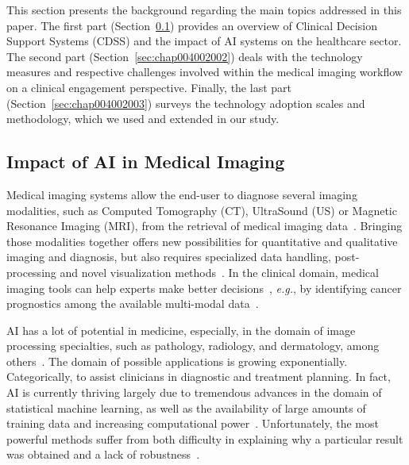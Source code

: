 This section presents the background regarding the main topics addressed in this paper.
The first part (Section~\ref{sec:chap004002001}) provides an overview of Clinical Decision Support Systems (CDSS) and the impact of AI systems on the healthcare sector.
The second part (Section~\ref{sec:chap004002002}) deals with the technology measures and respective challenges involved within the medical imaging workflow on a clinical engagement perspective.
Finally, the last part (Section~\ref{sec:chap004002003}) surveys the technology adoption scales and methodology, which we used and extended in our study.

\subsection{Impact of AI in Medical Imaging}
\label{sec:chap004002001}

Medical imaging systems allow the end-user to diagnose several imaging modalities, such as Computed Tomography (CT), UltraSound (US) or Magnetic Resonance Imaging (MRI), from the retrieval of medical imaging data~\cite{WO2022071818A1, faraji2019radiologic, seifabadi2019correlation}.
Bringing those modalities together offers new possibilities for quantitative and qualitative imaging and diagnosis, but also requires specialized data handling, post-processing and novel visualization methods~\cite{Igarashi:2016:IVS:2984511.2984537, Ocegueda-Hernandez:2016:CMN:2876456.2879485, Sousa:2017:VVR:3025453.3025566}.
In the clinical domain, medical imaging tools can help experts make better decisions~\cite{Lopes:2017:UHC:3143820.3144118}, {\it e.g.}, by identifying cancer prognostics among the available multi-modal data~\cite{calisto2017mimbcdui, lopes2018interaction}.

AI has a lot of potential in medicine, especially, in the domain of image processing specialties, such as pathology, radiology, and dermatology, among others~\cite{EVANS2022281, MULLER202267}.
The domain of possible applications is growing exponentially.
Categorically, to assist clinicians in diagnostic and treatment planning.
In fact, AI is currently thriving largely due to tremendous advances in the domain of statistical machine learning, as well as the availability of large amounts of training data and increasing computational power~\cite{10.1145/3399715.3399744}.
Unfortunately, the most powerful methods suffer from both difficulty in explaining why a particular result was obtained and a lack of robustness~\cite{make4020026}.

